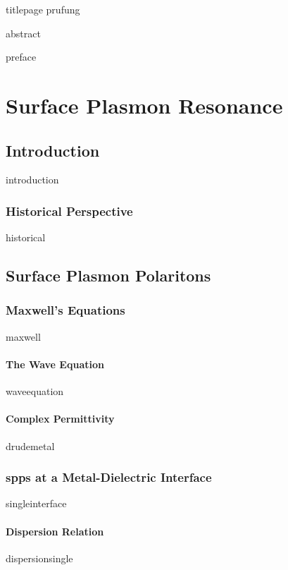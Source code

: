 \documentclass[12pt,a4paper,titlepage,onecolumn]{report}
\begin{document}
{titlepage}
{prufung}

{abstract}

\tableofcontents
\listoffigures
\listoftables



\label{ch:allintro}
{preface}

\part{Surface Plasmon Resonance}\label{part:spr}
\chapter{Introduction}\label{ch:sprintro}
{introduction}
\section{Historical Perspective}
{historical}

\chapter{Surface Plasmon Polaritons}\label{ch:existence}
\section{Maxwell's Equations}
{maxwell}
\subsection{The Wave Equation}
{waveequation}
\subsection{Complex Permittivity}
{drudemetal}
\section{\glspl{spp} at a Metal-Dielectric Interface}
{singleinterface}
\subsection{Dispersion Relation}
{dispersionsingle}
\end{document}
